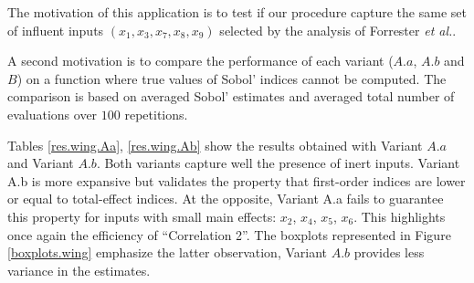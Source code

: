{The motivation of this application is to test if our procedure capture the same set of influent inputs $(x_1,x_3,x_7,x_8,x_9)$ selected by the analysis of Forrester \textit{et al.}. 

A second motivation is to compare the performance of each variant ($A.a$, $A.b$ and $B$) on a function where true values of Sobol' indices cannot be computed. The comparison is based on averaged Sobol' estimates and averaged total number of evaluations over $100$ repetitions.
\bigskip


Tables \ref{res.wing.Aa}, \ref{res.wing.Ab} show the results obtained with Variant $A.a$ and  Variant $A.b$. Both variants capture well the presence of inert inputs. Variant A.b is more expansive but validates the property that first-order indices are lower or equal to total-effect indices. At the opposite, Variant A.a fails to guarantee this property for inputs with small main effects: $x_2$, $x_4$, $x_5$, $x_6$. This highlights once again the efficiency of ``Correlation 2''. The boxplots represented in Figure \ref{boxplots.wing} emphasize the latter observation, Variant $A.b$ provides less variance in the estimates. 

}
